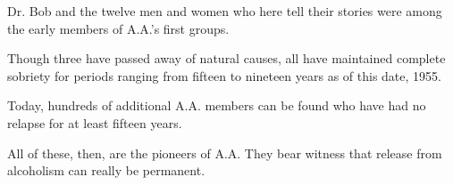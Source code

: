 \begin{biblechapter}
    Dr. Bob and the twelve men and women who here tell their stories 
    were among the early members of A.A.’s first groups.

\verse Though three have passed away of natural causes, 
    all have maintained complete sobriety 
    for periods ranging from fifteen to nineteen years 
    as of this date, 1955.

\verse Today, hundreds of additional A.A. members can be found 
    who have had no relapse for at least fifteen years.

\verse All of these, then, are the pioneers of A.A. 
\verse They bear witness that 
    release from alcoholism can really be permanent.

\end{biblechapter}

\twocolumn
